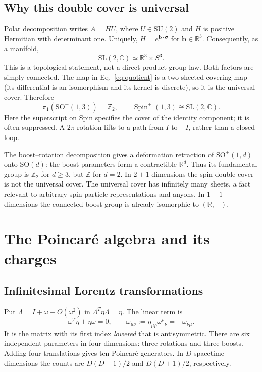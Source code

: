 \documentclass[11pt]{article}
\newcommand{\R}{\mathbb{R}}
\newcommand{\SO}{\mathrm{SO}}
\newcommand{\C}{\mathbb C}
\newcommand{\Z}{\mathbb Z}
\newcommand{\SU}{\mathrm{SU}}
\newcommand{\SL}{\mathrm{SL}}
\newcommand{\Spin}{\operatorname{Spin}}
\newcommand{\Lor}{\SO^+(1,3)}
\begin{document}
\subsection{Why this double cover is universal}
Polar decomposition writes \(A=HU\), where \(U\in\SU(2)\) and
\(H\) is positive Hermitian with determinant one. Uniquely,
\(H=e^{\bm b\cdot\bm\sigma}\) for \(\bm b\in\R^3\).
Consequently, as a manifold,
\begin{equation}
 \SL(2,\C)\simeq\R^3\times S^3.
 \label{eq:polar-topology}
\end{equation}
This is a topological statement, not a direct-product group law.
Both factors are simply connected. The map in Eq.~\eqref{eq:quotient}
is a two-sheeted covering map (its differential is an isomorphism and
its kernel is discrete), so it is the universal cover. Therefore
\begin{equation}
 \pi_1(\Lor)=\Z_2,\qquad
 \Spin^+(1,3)\cong\SL(2,\C).
 \label{eq:fundamental}
\end{equation}
Here the superscript on Spin specifies the cover of the identity
component; it is often suppressed. A \(2\pi\) rotation lifts to a path
from \(I\) to \(-I\), rather than a closed loop.

\begin{remarkbox}
The boost--rotation decomposition gives a deformation retraction of
\(\SO^+(1,d)\) onto \(\SO(d)\): the boost parameters form a contractible
\(\R^d\). Thus its fundamental group is \(\Z_2\) for \(d\geq3\),
but \(\Z\) for \(d=2\). In \(2+1\) dimensions the spin double cover
is not the universal cover. The universal cover has infinitely many
sheets, a fact relevant to arbitrary-spin particle representations and
anyons. In \(1+1\) dimensions the connected boost group is already
isomorphic to \((\R,+)\).
\end{remarkbox}

\section{The Poincar\'e algebra and its charges}
\subsection{Infinitesimal Lorentz transformations}
Put \(\Lambda=I+\omega+O(\omega^2)\) in
\(\Lambda^T\eta\Lambda=\eta\). The linear term is
\begin{equation}
 \omega^T\eta+\eta\omega=0,\qquad
 \omega_{\mu\nu}:=\eta_{\mu\rho}\omega^\rho{}_{\nu}
   =-\omega_{\nu\mu}.
 \label{eq:antisym-omega}
\end{equation}
It is the matrix with its first index \emph{lowered} that is antisymmetric.
There are six independent parameters in four dimensions: three rotations
and three boosts. Adding four translations gives ten Poincar\'e generators.
In \(D\) spacetime dimensions the counts are \(D(D-1)/2\) and
\(D(D+1)/2\), respectively.
\end{document}
